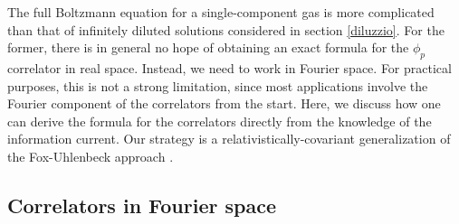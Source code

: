 \documentclass[aps,prd,preprint,nofootinbib,amsmath,amssymb,showpacs,longbibliography,singlecolumn,superscriptaddress,10pt]{revtex4-1}
\theoremstyle{plain}
\theoremstyle{definition}
\begin{document}
The full Boltzmann equation for a single-component gas is more complicated than that of infinitely diluted solutions considered in section \ref{diluzzio}. For the former, there is in general no hope of obtaining an exact formula for the $\phi_p$ correlator in real space. Instead, we need to work in Fourier space. For practical purposes, this is not a strong limitation, since most applications involve the Fourier component of the correlators from the start. Here, we discuss how one can derive the formula for the correlators directly from the knowledge of the information current. Our strategy is a relativistically-covariant generalization \cite{Mullins:2023tjg, Mullins:2023ott} of the Fox-Uhlenbeck approach \cite{doi:10.1063/1.1693183, fox1970contributions}.


\subsection{Correlators in Fourier space}
\label{sec:corr-fourier-RTA}
\end{document}
